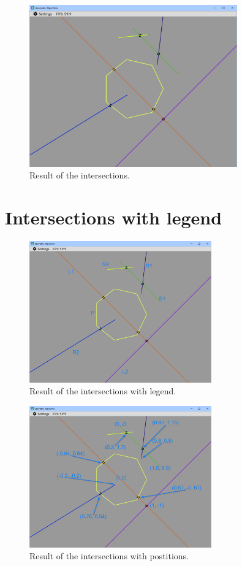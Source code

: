 \documentclass[12pt,a4paper,english]{article}
\begin{document}
\begin{figure}[H]
    \centering
    \includegraphics[width=0.8\textwidth]{result_1}
    \caption[]{Result of the intersections.}
    \label{fig:result_1}
\end{figure}

\newpage

\section{Intersections with legend}

\begin{figure}[H]
    \centering
    \includegraphics[width=0.7\textwidth]{result_2}
    \caption[]{Result of the intersections with legend.}
    \label{fig:result_2}
\end{figure}

\begin{figure}[H]
    \centering
    \includegraphics[width=0.7\textwidth]{result_3}
    \caption[]{Result of the intersections with postitions.}
    \label{fig:result_3}
\end{figure}
\end{document}
